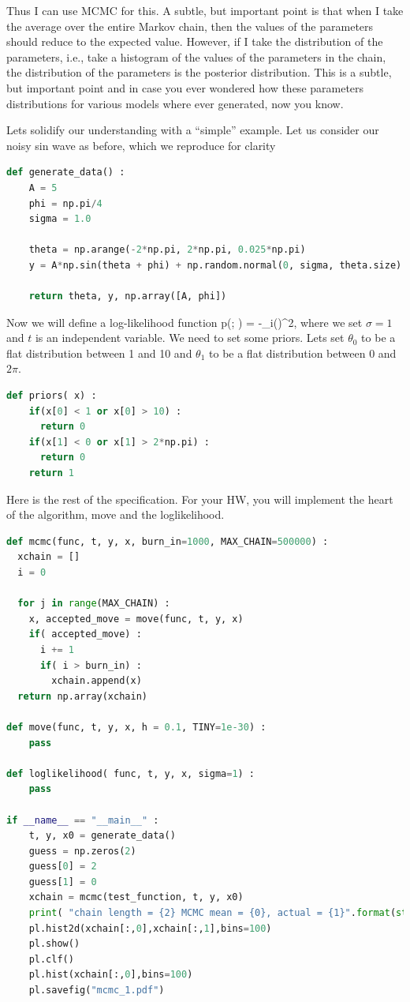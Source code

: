 Thus I can use MCMC for this.  A subtle, but important point is that when I take the average over the entire Markov chain, then the values of the parameters should reduce to the expected value.  However, if I take the distribution of the parameters, i.e., take a histogram of the values of the parameters in the chain, the distribution of the parameters is the posterior distribution.  This is a subtle, but important point and in case you ever wondered how these parameters distributions for various models where ever generated, now you know. 

Lets solidify our understanding with a ``simple'' example.  Let us consider our noisy sin wave as before, which we reproduce for clarity

\begin{lstlisting}[language=Python]
def generate_data() :
    A = 5
    phi = np.pi/4
    sigma = 1.0
  
    theta = np.arange(-2*np.pi, 2*np.pi, 0.025*np.pi)
    y = A*np.sin(theta + phi) + np.random.normal(0, sigma, theta.size)
  
    return theta, y, np.array([A, phi])
\end{lstlisting}  

Now we will define a log-likelihood function
\be
\log p(; \vec{\theta}) = -\sum_i\left(\right)^2,
\ee
where we set $\sigma = 1$ and $t$ is an independent variable.  We need to set some priors. Lets set $\theta_0$ to be a flat distribution between 1 and 10 and $\theta_1$ to be a flat distribution between 0 and $2\pi$.  

\begin{lstlisting}[language=Python]
def priors( x) : 
    if(x[0] < 1 or x[0] > 10) : 
      return 0
    if(x[1] < 0 or x[1] > 2*np.pi) : 
      return 0
    return 1  
\end{lstlisting}

Here is the rest of the specification.  For your HW, you will implement the heart of the algorithm, move and the loglikelihood.

\begin{lstlisting}[language=Python]
def mcmc(func, t, y, x, burn_in=1000, MAX_CHAIN=500000) :
  xchain = [] 
  i = 0

  for j in range(MAX_CHAIN) : 
    x, accepted_move = move(func, t, y, x)
    if( accepted_move) :
      i += 1 
      if( i > burn_in) : 
        xchain.append(x)
  return np.array(xchain)

def move(func, t, y, x, h = 0.1, TINY=1e-30) :
    pass

def loglikelihood( func, t, y, x, sigma=1) : 
    pass

if __name__ == "__main__" : 
    t, y, x0 = generate_data()
    guess = np.zeros(2)
    guess[0] = 2
    guess[1] = 0
    xchain = mcmc(test_function, t, y, x0)
    print( "chain length = {2} MCMC mean = {0}, actual = {1}".format(str(np.average(xchain, axis=0)), str(x0), xchain.shape[0]))
    pl.hist2d(xchain[:,0],xchain[:,1],bins=100)
    pl.show()
    pl.clf()
    pl.hist(xchain[:,0],bins=100)
    pl.savefig("mcmc_1.pdf")

\end{lstlisting}


